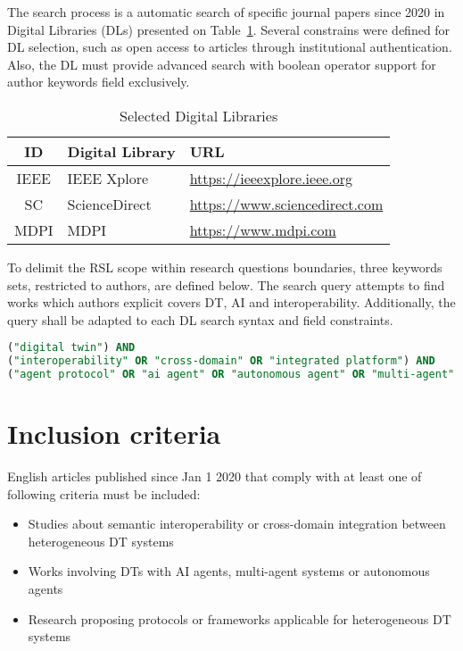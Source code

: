 The search process is a automatic search of specific journal papers since 2020 in 
    Digital Libraries (DLs) presented on Table~\ref{tab:digital-library}.
Several constrains were defined for DL selection, such as
    open access to articles through institutional authentication.
Also, the DL must provide advanced search with boolean operator support for 
    author keywords field exclusively.

\begin{table}[H]
    \centering
    \caption{Selected Digital Libraries}
    \label{tab:digital-library}
    \begin{tabular}{c | l | l}
        \textbf{ID} & \textbf{Digital Library} & \textbf{URL} \\
        \hline
        IEEE & IEEE Xplore   & \url{https://ieeexplore.ieee.org} \\
        SC   & ScienceDirect & \url{https://www.sciencedirect.com} \\
        MDPI & MDPI          & \url{https://www.mdpi.com} \\
    \end{tabular}
\end{table}

To delimit the RSL scope within research questions boundaries, three keywords sets, restricted to authors, are defined below.
The search query attempts to find works which authors explicit covers DT, AI and interoperability.
Additionally, the query shall be adapted to each DL search syntax and field constraints.

\begin{lstlisting}[language=SQL, label=lst:search-query, caption=Search Query Structure, basicstyle=\ttfamily\small, breaklines, breakatwhitespace]
("digital twin") AND 
("interoperability" OR "cross-domain" OR "integrated platform") AND 
("agent protocol" OR "ai agent" OR "autonomous agent" OR "multi-agent" OR "agent-mediated" OR "agent communication" OR "large language model" OR "llm" OR "generative ai")
\end{lstlisting}

\section{Inclusion criteria}

English articles published since Jan 1 2020 that comply with
    at least one of following criteria must be included:

\begin{itemize}
    \item Studies about semantic interoperability or cross-domain integration between heterogeneous DT systems
    \item Works involving DTs with AI agents, multi-agent systems or autonomous agents
    \item Research proposing protocols or frameworks applicable for heterogeneous DT systems
\end{itemize}

